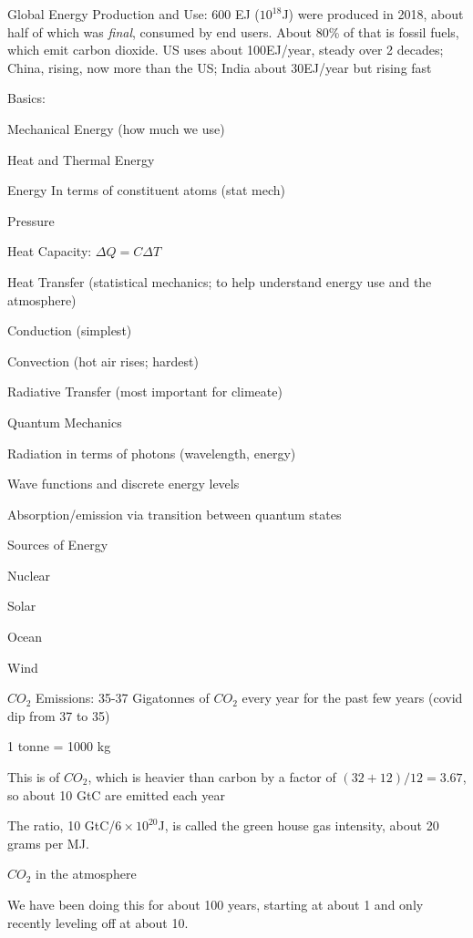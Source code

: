 \documentclass[11pt]{book}
\begin{document}
\bei
\item Global Energy Production and Use: 600 EJ ($10^{18}$J) were produced in 2018, about half of which was {\it final}, consumed by end users. About 80\% of that is fossil fuels, which emit carbon dioxide. US uses about 100EJ/year, steady over 2 decades; China, rising, now more than the US; India about 30EJ/year but rising fast
\item Basics:
\bee
\item Mechanical Energy (how much we use)
\item Heat and Thermal Energy
\bei
\item Energy In terms of constituent atoms (stat mech)
\item Pressure
\item Heat Capacity: $\Delta Q=C \Delta T$
\eei
\item Heat Transfer (statistical mechanics; to help understand energy use and the atmosphere)
\bei
\item Conduction (simplest)
\item Convection (hot air rises; hardest)
\item Radiative Transfer (most important for climeate)
\eei
\item Quantum Mechanics 
\bei
\item Radiation in terms of photons (wavelength, energy)
\item Wave functions and discrete energy levels 
\item Absorption/emission via transition between quantum states
\eei 
\eee
\item Sources of Energy
\bee
\item Nuclear
\item Solar
\item Ocean
\item Wind
\eee 
\item $CO_2$ Emissions: 35-37 Gigatonnes of $CO_2$ every year for the past few years (covid dip from 37 to 35)
\bee
\item 1 tonne = 1000 kg
\item This is of $CO_2$, which is heavier than carbon by a factor of $(32+12)/12=3.67$, so about 10 GtC are emitted each year
\item The ratio, 10 GtC/$6\times 10^{20}$J, is called the green house gas intensity, about 20 grams per MJ.
\eee
\item $CO_2$ in the atmosphere
\bee
\item We have been doing this for about 100 years, starting at about 1 and only recently leveling off at about 10. 
\end{document}
